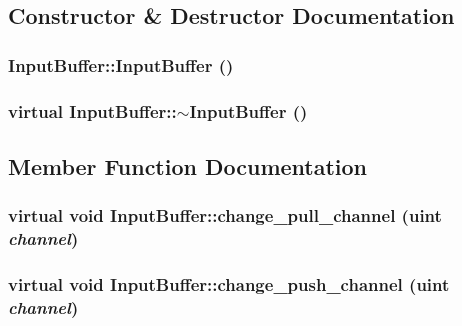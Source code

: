 \subsection{Constructor \& Destructor Documentation}
\hypertarget{classInputBuffer_539e007478e6a19dd2c933e2fe6f6b5c}{
\subsubsection[{InputBuffer}]{\setlength{\rightskip}{0pt plus 5cm}InputBuffer::InputBuffer ()}}
\label{classInputBuffer_539e007478e6a19dd2c933e2fe6f6b5c}


\hypertarget{classInputBuffer_c8e553cdc4097665450a7b83b797475c}{
\subsubsection[{$\sim$InputBuffer}]{\setlength{\rightskip}{0pt plus 5cm}virtual InputBuffer::$\sim$InputBuffer ()}}
\label{classInputBuffer_c8e553cdc4097665450a7b83b797475c}




\subsection{Member Function Documentation}
\hypertarget{classInputBuffer_86629ae58a881f42b19edfe07a53b8f0}{
\subsubsection[{change\_\-pull\_\-channel}]{\setlength{\rightskip}{0pt plus 5cm}virtual void InputBuffer::change\_\-pull\_\-channel ({\bf uint} {\em channel})}}
\label{classInputBuffer_86629ae58a881f42b19edfe07a53b8f0}


\hypertarget{classInputBuffer_b63bf4f28edd8364edf000675bbf08ac}{
\subsubsection[{change\_\-push\_\-channel}]{\setlength{\rightskip}{0pt plus 5cm}virtual void InputBuffer::change\_\-push\_\-channel ({\bf uint} {\em channel})}}
\label{classInputBuffer_b63bf4f28edd8364edf000675bbf08ac}


